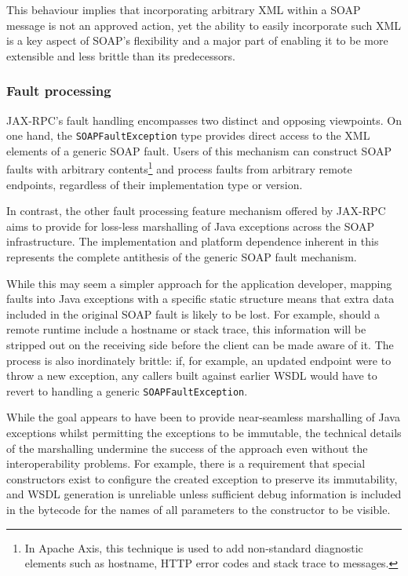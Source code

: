 This behaviour implies that incorporating arbitrary XML within a SOAP
message is not an approved action, yet the ability to easily
incorporate such XML is a key aspect of SOAP's flexibility and a major
part of enabling it to be more extensible and less brittle than its
predecessors.

\subsubsection{Fault processing}
\label{objections:soap-not-rmi:faults}

JAX-RPC's fault handling encompasses two distinct and opposing
viewpoints. On one hand, the {\tt SOAPFaultException} type provides
direct access to the XML elements of a generic SOAP fault. Users of
this mechanism can construct SOAP faults with arbitrary
contents\footnote{In Apache Axis, this technique is used to add
non-standard diagnostic elements such as hostname, HTTP error codes
and stack trace to messages.} and process faults from arbitrary remote
endpoints, regardless of their implementation type or version.

In contrast, the other fault processing feature mechanism offered by
JAX-RPC aims to provide for loss-less marshalling of Java exceptions
across the SOAP infrastructure. The implementation and platform
dependence inherent in this represents the complete antithesis of the
generic SOAP fault mechanism.

While this may seem a simpler approach for the application developer,
mapping faults into Java exceptions with a specific static structure
means that extra data included in the original SOAP fault is likely to
be lost. For example, should a remote runtime include a hostname or
stack trace, this information will be stripped out on the receiving
side before the client can be made aware of it. The process is also
inordinately brittle: if, for example, an updated endpoint were to
throw a new exception, any callers built against earlier WSDL would
have to revert to handling a generic {\tt SOAPFaultException}.

While the goal appears to have been to provide near-seamless
marshalling of Java exceptions whilst permitting the exceptions to be
immutable, the technical details of the marshalling undermine the
success of the approach even without the interoperability problems.
For example, there is a requirement that special constructors exist to
configure the created exception to preserve its immutability, and WSDL
generation is unreliable unless sufficient debug information is
included in the bytecode for the names of all parameters to the
constructor to be visible.

